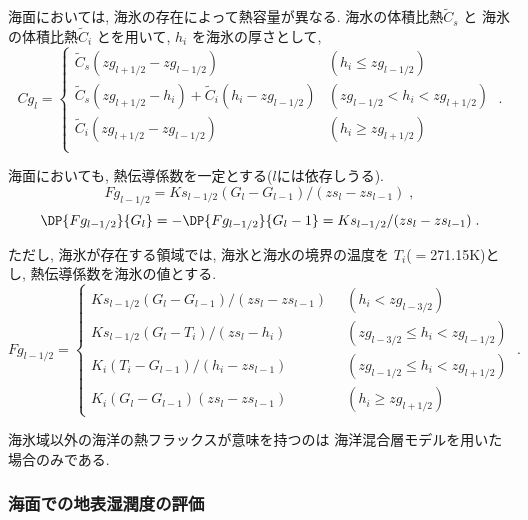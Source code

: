 海面においては, 海氷の存在によって熱容量が異なる.
海水の体積比熱$\tilde{C}_s$ と
海氷の体積比熱$\tilde{C}_i$ とを用いて, $h_i$ を海氷の厚さとして,
\begin{equation}
  Cg_{l}  = \left\{ 
    \begin{array}{ll}
      \tilde{C}_s (zg_{l+1/2} - zg_{l-1/2})
              & ( h_i \le zg_{l-1/2} )\\
      \tilde{C}_s (zg_{l+1/2} - h_i)
    + \tilde{C}_i ( h_i - zg_{l-1/2} )
              & ( zg_{l-1/2} < h_i < zg_{l+1/2} )\\
      \tilde{C}_i (zg_{l+1/2} - zg_{l-1/2})
              & ( h_i \ge zg_{l+1/2} ) \\
    \end{array} 
    \right. \; .
\end{equation}

海面においても, 熱伝導係数を一定とする($l$には依存しうる).
\begin{equation}
  Fg_{l-1/2} = Ks_{l-1/2} (G_l - G_{l-1})/(zs_l - zs_{l-1}) \; ,
\end{equation}
\begin{equation}
  \DP{Fg_{l-1/2}}{G_l} = - \DP{Fg_{l-1/2}}{G_l-1} 
 = Ks_{l-1/2}/(zs_l - zs_{l-1}) \; .
\end{equation}

ただし, 海氷が存在する領域では, 
海氷と海水の境界の温度を $T_i$($=$271.15K)とし,
熱伝導係数を海氷の値とする.
\begin{equation}
  Fg_{l-1/2}  = \left\{ 
    \begin{array}{ll}
      Ks_{l-1/2} (G_l - G_{l-1})/(zs_l - zs_{l-1}) \;\; 
              & (h_i < zg_{l-3/2} ) \\
      Ks_{l-1/2} (G_l - T_i)/(zs_l - h_i) \;\; 
              & ( zg_{l-3/2} \le h_i < zg_{l-1/2} )\\
      K_i (T_i - G_{l-1})/(h_i - zs_{l-1}) \;\; 
              & ( zg_{l-1/2} \le h_i < zg_{l+1/2} )\\
      K_i (G_l - G_{l-1})(zs_l - zs_{l-1}) \;\; 
              & (h_i \ge zg_{l+1/2} )
    \end{array} 
    \right. \; .
\end{equation}

海氷域以外の海洋の熱フラックスが意味を持つのは
海洋混合層モデルを用いた場合のみである.

\subsubsection{海面での地表湿潤度の評価}


